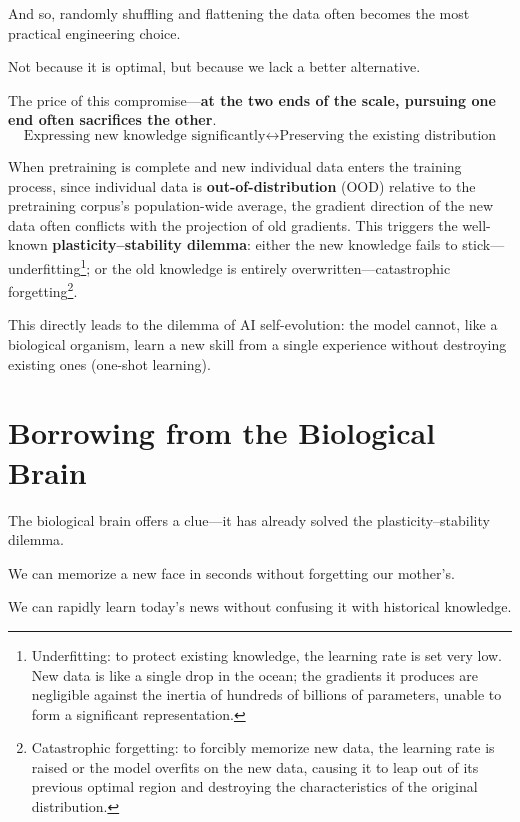 And so, randomly shuffling and flattening the data often becomes the most practical engineering choice.

Not because it is optimal, but because we lack a better alternative.

\vspace{1em}
The price of this compromise---\textbf{at the two ends of the scale, pursuing one end often sacrifices the other}.
\begin{equation*}
\text{Expressing new knowledge significantly} \longleftrightarrow \text{Preserving the existing distribution}
\end{equation*}

When pretraining is complete and new individual data enters the training process, since individual data is \textbf{out-of-distribution} (OOD) relative to the pretraining corpus's population-wide average, the gradient direction of the new data often conflicts with the projection of old gradients. This triggers the well-known \textbf{plasticity--stability dilemma}: either the new knowledge fails to stick---underfitting\footnote{Underfitting: to protect existing knowledge, the learning rate is set very low. New data is like a single drop in the ocean; the gradients it produces are negligible against the inertia of hundreds of billions of parameters, unable to form a significant representation.}; or the old knowledge is entirely overwritten---catastrophic forgetting\footnote{Catastrophic forgetting: to forcibly memorize new data, the learning rate is raised or the model overfits on the new data, causing it to leap out of its previous optimal region and destroying the characteristics of the original distribution.}.

\vspace{1em}

This directly leads to the dilemma of AI self-evolution: the model cannot, like a biological organism, learn a new skill from a single experience without destroying existing ones (one-shot learning).

\newpage
\section{Borrowing from the Biological Brain}
The biological brain offers a clue---it has already solved the plasticity--stability dilemma.

We can memorize a new face in seconds without forgetting our mother's.

We can rapidly learn today's news without confusing it with historical knowledge.

